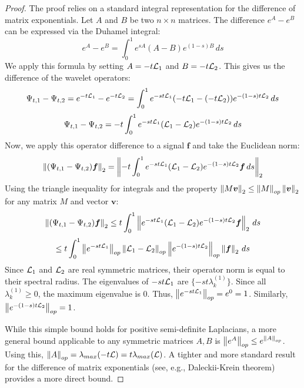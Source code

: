 \begin{proof}
The proof relies on a standard integral representation for the difference of matrix exponentials. Let $A$ and $B$ be two $n \times n$ matrices. The difference $e^A - e^B$ can be expressed via the Duhamel integral:
\begin{equation}
    e^A - e^B = \int_0^1 e^{sA} (A - B) e^{(1-s)B} \, ds
\end{equation}
We apply this formula by setting $A = -t\mathcal{L}_1$ and $B = -t\mathcal{L}_2$. This gives us the difference of the wavelet operators:
\begin{equation}
    \Psi_{t,1} - \Psi_{t,2} = e^{-t\mathcal{L}_1} - e^{-t\mathcal{L}_2} = \int_0^1 e^{-st\mathcal{L}_1} (-t\mathcal{L}_1 - (-t\mathcal{L}_2)) e^{-(1-s)t\mathcal{L}_2} \, ds
\end{equation}
\begin{equation}
    \Psi_{t,1} - \Psi_{t,2} = -t \int_0^1 e^{-st\mathcal{L}_1} (\mathcal{L}_1 - \mathcal{L}_2) e^{-(1-s)t\mathcal{L}_2} \, ds
\end{equation}
Now, we apply this operator difference to a signal $\bm{f}$ and take the Euclidean norm:
\begin{equation}
    \left\lVert(\Psi_{t,1} - \Psi_{t,2})\bm{f}\right\rVert_2 = \left\lVert-t \int_0^1 e^{-st\mathcal{L}_1} (\mathcal{L}_1 - \mathcal{L}_2) e^{-(1-s)t\mathcal{L}_2} \bm{f} \, ds\right\rVert_2
\end{equation}
Using the triangle inequality for integrals and the property $\left\lVert M\bm{v}\right\rVert_2 \le \left\lVert M\right\rVert_{op}\left\lVert\bm{v}\right\rVert_2$ for any matrix $M$ and vector $\bm{v}$:
\begin{equation}
    \left\lVert(\Psi_{t,1} - \Psi_{t,2})\bm{f}\right\rVert_2 \le t \int_0^1 \left\lVert e^{-st\mathcal{L}_1} (\mathcal{L}_1 - \mathcal{L}_2) e^{-(1-s)t\mathcal{L}_2} \bm{f}\right\rVert_2 \, ds
\end{equation}
\begin{equation}
    \le t \int_0^1 \left\lVert e^{-st\mathcal{L}_1}\right\rVert_{op} \left\lVert\mathcal{L}_1 - \mathcal{L}_2\right\rVert_{op} \left\lVert e^{-(1-s)t\mathcal{L}_2}\right\rVert_{op} \left\lVert\bm{f}\right\rVert_2 \, ds
\end{equation}
Since $\mathcal{L}_1$ and $\mathcal{L}_2$ are real symmetric matrices, their operator norm is equal to their spectral radius. The eigenvalues of $-st\mathcal{L}_1$ are $\{-st\lambda_k^{(1)}\}$. Since all $\lambda_k^{(1)} \ge 0$, the maximum eigenvalue is 0. Thus, $\left\lVert e^{-st\mathcal{L}_1}\right\rVert_{op} = e^0 = 1$. Similarly, $\left\lVert e^{-(1-s)t\mathcal{L}_2}\right\rVert_{op} = 1$.

While this simple bound holds for positive semi-definite Laplacians, a more general bound applicable to any symmetric matrices $A,B$ is $\left\lVert e^A\right\rVert_{op} \le e^{\left\lVert A\right\rVert_{op}}$. Using this, $\left\lVert A\right\rVert_{op} = \lambda_{max}(-t\mathcal{L}) = t \lambda_{max}(\mathcal{L})$. A tighter and more standard result for the difference of matrix exponentials (see, e.g., Daleckii-Krein theorem) provides a more direct bound.


\end{proof}
